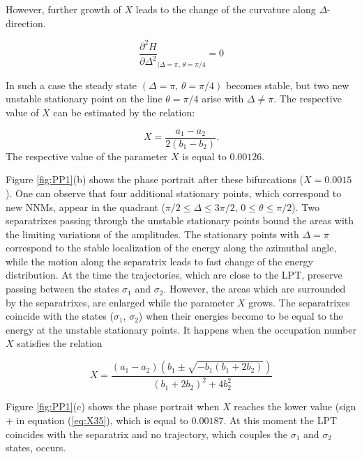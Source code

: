 However, further growth of $X$ leads to the change of the curvature along $\Delta$-direction.

\begin{equation}
\frac{\partial ^{2} H}{\partial \Delta ^{2}}_{|\Delta=\pi,\, \theta=\pi/4} = 0
\end{equation}

In such a case the steady state $(\Delta = \pi,\, \theta=\pi/4)$ becomes stable, but two new unstable stationary point on the line $\theta= \pi/4$ arise with $\Delta \ne \pi$.
The respective value of $X$ can be estimated by the relation:

\begin{equation}\label{eq:X2}
X=\frac{a_{1}-a_{2}}{2(b_{1}-b_{2})}.
\end{equation}
 The respective value of the parameter $X$ is equal to $0.00126$.
 
Figure \ref{fig:PP1}(b) shows the phase portrait after these bifurcations ($X=0.0015$).
One can observe that four additional stationary points, which correspond to new NNMs,  appear in the quadrant ($\pi/2 \le \Delta \le 3\pi/2, \, 0 \le \theta \le \pi/2$).
Two separatrixes passing through the unstable stationary points bound the areas with the limiting variations of the amplitudes.
The stationary points with $\Delta = \pi$ correspond to the stable localization of the energy along the azimuthal angle, while the motion along the separatrix leads to fast change of the energy distribution. 
At the time the trajectories, which are close to the LPT, preserve passing between the states $\sigma_{1}$ and $\sigma_{2}$.
However, the areas which are surrounded by the separatrixes, are enlarged while the parameter $X$ grows.
The separatrixes coincide with the states ($\sigma_{1}$, $\sigma_{2}$) when their energies become to be equal to the energy at the unstable stationary points. 
It happens when the occupation number $X$ satisfies the relation

\begin{equation}\label{eq:X35}
X=\frac{\left(a_{1}-a_{2} \right) \left(b_{1} \pm \sqrt{-b_{1} (b_{1}+2 b_{2})} \right)}{\left(b_{1}+2 b_{2} \right)^{2}+4 b_{2}^{2}}
\end{equation}

Figure \ref{fig:PP1}(c) shows the phase portrait when $X$ reaches the lower value (sign $+$ in equation (\ref{eq:X35}), which is equal to $0.00187$.
At this moment the LPT coincides with the separatrix and no trajectory, which couples the $\sigma_{1}$ and $\sigma_{2}$ states, occurs.

